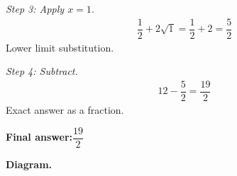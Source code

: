 \documentclass[11pt]{article}
\begin{document}
\textit{Step 3: Apply \( x = 1 \).}
\[\begin{gathered}
\dfrac{1}{2} + 2\sqrt{1} = \dfrac{1}{2} + 2 = \dfrac{5}{2}
\end{gathered}\]
Lower limit substitution.

\textit{Step 4: Subtract.}
\[\begin{gathered}
12 - \dfrac{5}{2} = \dfrac{19}{2}
\end{gathered}\]
Exact answer as a fraction.

\begin{answerbox}
\textbf{Final answer:}\quad \(\displaystyle \dfrac{19}{2}\)
\end{answerbox}
\textbf{Diagram.}

\begin{center}
\end{center}
\end{document}
